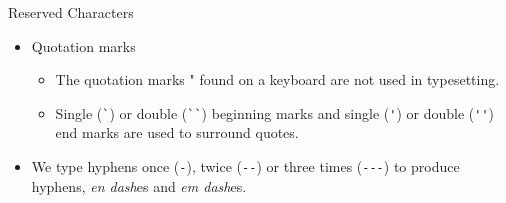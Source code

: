\begin{frame}[fragile,c]{Reserved Characters}
	\begin{itemize}
		\item Quotation marks
			\begin{itemize}
				\item The quotation marks " found on a keyboard are not used in typesetting.
				\item Single (\lstinline|`|) or double (\lstinline|``|) beginning marks and single (\lstinline|'|) or double (\lstinline|''|) end marks are used to surround quotes.
			\end{itemize}
		\item We type hyphens once (\lstinline|-|), twice (\lstinline|--|) or three times (\lstinline|---|) to produce hyphens, \emph{en dash}es and \emph{em dash}es.
	\end{itemize}
\end{frame}